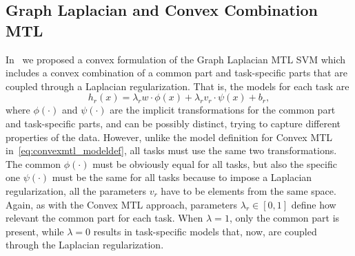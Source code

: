 \subsection{Graph Laplacian and Convex Combination MTL}



In~\cite{RuizAD21_hais} we proposed a convex formulation of the Graph Laplacian MTL SVM which includes a convex combination of a common part and task-specific parts that are coupled through a Laplacian regularization.
That is, the models for each task are
\begin{equation}
    \nonumber
    h_r(x) = \lambda_r w \cdot \phi(x) + \lambda_r v_r \cdot \psi(x) + b_r ,
\end{equation}
where $\phi(\cdot)$ and $\psi(\cdot)$ are the implicit transformations for the common part and task-specific parts, and can be possibly distinct, trying to capture different properties of the data.
However, unlike the model definition for Convex MTL in~\eqref{eq:convexmtl_modeldef}, all tasks must use the same two transformations. The common $\phi(\cdot)$ must be obviously equal for all tasks, but also the specific one $\psi(\cdot)$ must be the same for all tasks because to impose a Laplacian regularization, all the parameters $v_r$ have to be elements from the same space.
Again, as with the Convex MTL approach, parameters $\lambda_r \in [0, 1]$ define how relevant the common part for each task. When $\lambda=1$, only the common part is present, while $\lambda=0$ results in task-specific models that, now, are coupled through the Laplacian regularization.


